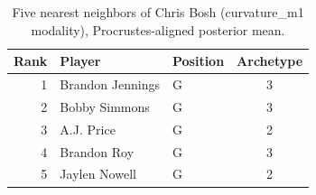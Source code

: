 \begin{table}[htbp]
  \centering\small
  \begin{tabular}{rllc}
    \toprule
    Rank & Player & Position & Archetype \\
    \midrule
    1 & Brandon Jennings & G & 3 \\
    2 & Bobby Simmons & G & 3 \\
    3 & A.J. Price & G & 2 \\
    4 & Brandon Roy & G & 3 \\
    5 & Jaylen Nowell & G & 2 \\
    \bottomrule
  \end{tabular}
  \caption{Five nearest neighbors of Chris Bosh (curvature_m1 modality), Procrustes-aligned posterior mean.}
  \label{tab:Chris_Bosh_neighbors_curvature_m1}
\end{table}

